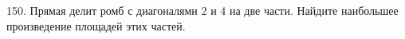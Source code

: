 150. Прямая делит ромб с диагоналями 2 и 4 на две части. Найдите наибольшее произведение площадей
этих частей.\\
